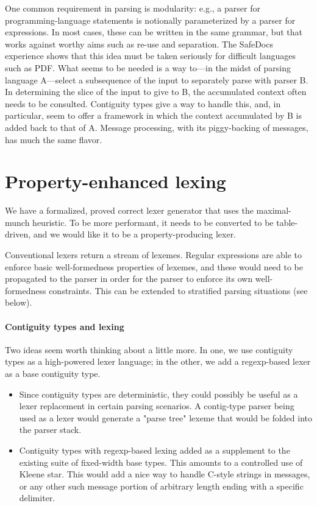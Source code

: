\documentclass{article}
\theoremstyle{definition}
\begin{document}
   One common requirement in parsing is modularity: e.g., a parser for
   programming-language statements is notionally parameterized by a
   parser for expressions. In most cases, these can be written in the
   same grammar, but that works against worthy aims such as re-use and
   separation. The SafeDocs experience shows that this idea must be
   taken seriously for difficult languages such as PDF. What seems to
   be needed is a way to---in the midst of parsing language A---select
   a subsequence of the input to separately parse with parser B. In
   determining the slice of the input to give to B, the accumulated
   context often needs to be consulted. Contiguity types give a way to
   handle this, and, in particular, seem to offer a framework in which
   the context accumulated by B is added back to that of A. Message
   processing, with its piggy-backing of messages, has much the same
   flavor.

\section{Property-enhanced lexing}

   We have a formalized, proved correct lexer generator that uses the
   maximal-munch heuristic. To be more performant, it needs to be
   converted to be table-driven, and we would like it to be a
   property-producing lexer.

   Conventional lexers return a stream of lexemes. Regular expressions
   are able to enforce basic well-formedness properties of lexemes,
   and these would need to be propagated to the parser in order for
   the parser to enforce its own well-formedness constraints. This can
   be extended to stratified parsing situations (see below).


\paragraph{Contiguity types and lexing}

   Two ideas seem worth thinking about a little more. In one, we use
   contiguity types as a high-powered lexer language; in the other, we
   add a regexp-based lexer as a base contiguity type.

\begin{itemize}

\item Since contiguity types are deterministic, they could possibly be
      useful as a lexer replacement in certain parsing scenarios. A
      contig-type parser being used as a lexer would generate a "parse
      tree" lexeme that would be folded into the parser stack.

\item Contiguity types with regexp-based lexing added as a supplement
      to the existing suite of fixed-width base types. This amounts to
      a controlled use of Kleene star. This would add a nice way to
      handle C-style strings in messages, or any other such message
      portion of arbitrary length ending with a specific delimiter.

\end{itemize}
\end{document}

